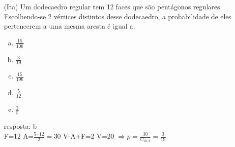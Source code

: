 \begin{ex}
  (Ita) Um dodecaedro regular tem 12 faces que são pentágonos regulares. Escolhendo-se 2 vértices distintos desse dodecaedro, a probabilidade de eles pertencerem a uma mesma aresta é igual a:
    \begin{enumerate}  [(a)]
        \item $\frac{15}{100}$
        \item $\frac{3}{19}$
        \item $\frac{15}{190}$
        \item $\frac{5}{12}$
        \item $\frac{2}{5}$
    \end{enumerate}
      \begin{sol}
       resposta: b\\
       F=12\hspace{0,5cm}  A=$\frac{5\cdot12}{2}=30$ \hspace{0,5cm} V-A+F=2 \hspace{0,5cm} V=20 \hspace{0,5cm} $\Longrightarrow p=\frac{30}{\mathrm{C}_{{20},2}}=\frac{3}{19}$ 
      \end{sol}
 \end{ex}